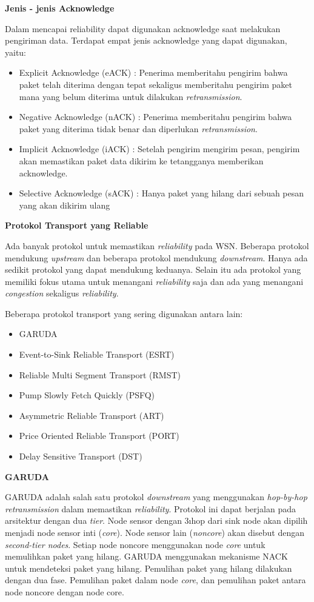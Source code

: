 \documentclass[a4paper,twoside]{article}
\begin{document}
\begin{enumerate}
\textbf{Jenis - jenis Acknowledge}

Dalam mencapai reliability dapat digunakan acknowledge saat melakukan pengiriman data. Terdapat empat jenis acknowledge yang dapat digunakan, yaitu:
\begin{itemize}
	\item Explicit Acknowledge (eACK) : Penerima memberitahu pengirim bahwa paket telah diterima dengan tepat sekaligus memberitahu pengirim paket mana yang belum diterima untuk dilakukan \textit{retransmission}.
	\item Negative Acknowledge (nACK) : Penerima memberitahu pengirim bahwa paket yang diterima tidak benar dan diperlukan \textit{retransmission}.
	\item Implicit Acknowledge (iACK) : Setelah pengirim mengirim pesan, pengirim akan memastikan paket data dikirim ke tetangganya memberikan acknowledge.
	\item Selective Acknowledge (sACK) : Hanya paket yang hilang dari sebuah pesan yang akan dikirim ulang
\end{itemize}

\textbf{Protokol Transport yang Reliable}

Ada banyak protokol untuk memastikan \textit{reliability} pada WSN. Beberapa protokol mendukung \textit{upstream} dan beberapa protokol mendukung \textit{downstream}. Hanya ada sedikit protokol yang dapat mendukung keduanya. Selain itu ada protokol yang memiliki fokus utama untuk menangani \textit{reliability} saja dan ada yang menangani \textit{congestion} sekaligus \textit{reliability}. 

Beberapa protokol transport yang sering digunakan antara lain:
\begin{itemize}
	\item GARUDA
	\item Event-to-Sink Reliable Transport (ESRT)
	\item Reliable Multi Segment Transport (RMST)
	\item Pump Slowly Fetch Quickly (PSFQ)
	\item Asymmetric Reliable Transport (ART)
	\item Price Oriented Reliable Transport (PORT)
	\item Delay Sensitive Transport (DST)
\end{itemize}

\textbf{GARUDA}

GARUDA adalah salah satu protokol \textit{downstream} yang menggunakan \textit{hop-by-hop retransmission} dalam memastikan \textit{reliability}. Protokol ini dapat berjalan pada arsitektur dengan dua \textit{tier}. Node sensor dengan 3\i hop dari sink node akan dipilih menjadi node sensor inti (\textit{core}). Node sensor lain (\textit{noncore}) akan disebut dengan \textit{second-tier nodes}. Setiap node noncore menggunakan node \textit{core} untuk memulihkan paket yang hilang.  GARUDA menggunakan mekanisme NACK untuk mendeteksi paket yang hilang. Pemulihan paket yang hilang dilakukan dengan dua fase. Pemulihan paket dalam node \textit{core}, dan pemulihan paket antara node noncore dengan node core. 


\end{enumerate}
\end{document}
